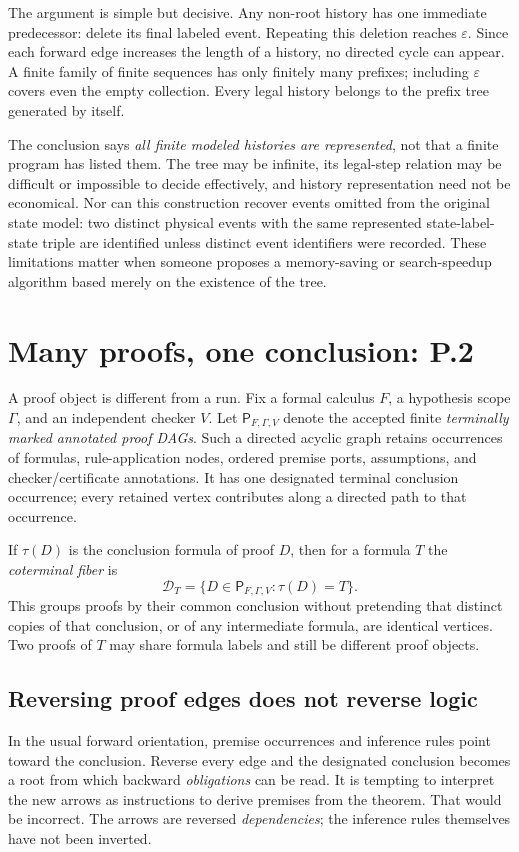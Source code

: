\documentclass[11pt,letterpaper]{article}
\theoremstyle{plaincompact}
\newcommand{\proofs}{\mathsf P_{F,\Gamma,V}}
\begin{document}
The argument is simple but decisive. Any non-root history has one immediate predecessor: delete its final labeled event. Repeating this deletion reaches $\varepsilon$. Since each forward edge increases the length of a history, no directed cycle can appear. A finite family of finite sequences has only finitely many prefixes; including $\varepsilon$ covers even the empty collection. Every legal history belongs to the prefix tree generated by itself.

The conclusion says \emph{all finite modeled histories are represented}, not that a finite program has listed them. The tree may be infinite, its legal-step relation may be difficult or impossible to decide effectively, and history representation need not be economical. Nor can this construction recover events omitted from the original state model: two distinct physical events with the same represented state-label-state triple are identified unless distinct event identifiers were recorded. These limitations matter when someone proposes a memory-saving or search-speedup algorithm based merely on the existence of the tree.

\section{Many proofs, one conclusion: P.2}
A proof object is different from a run. Fix a formal calculus $F$, a hypothesis scope $\Gamma$, and an independent checker $V$. Let $\proofs$ denote the accepted finite \emph{terminally marked annotated proof DAGs}. Such a directed acyclic graph retains occurrences of formulas, rule-application nodes, ordered premise ports, assumptions, and checker/certificate annotations. It has one designated terminal conclusion occurrence; every retained vertex contributes along a directed path to that occurrence.

If $\tau(D)$ is the conclusion formula of proof $D$, then for a formula $T$ the \emph{coterminal fiber} is
\[
\mathcal D_T=\{D\in\proofs:\tau(D)=T\}.
\]
This groups proofs by their common conclusion without pretending that distinct copies of that conclusion, or of any intermediate formula, are identical vertices. Two proofs of $T$ may share formula labels and still be different proof objects.

\subsection{Reversing proof edges does not reverse logic}
In the usual forward orientation, premise occurrences and inference rules point toward the conclusion. Reverse every edge and the designated conclusion becomes a root from which backward \emph{obligations} can be read. It is tempting to interpret the new arrows as instructions to derive premises from the theorem. That would be incorrect. The arrows are reversed \emph{dependencies}; the inference rules themselves have not been inverted.
\end{document}
